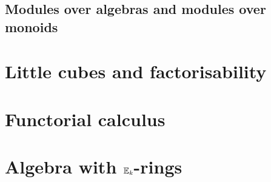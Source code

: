         \subsection{Modules over algebras and modules over monoids}
    
    \section{Little cubes and factorisability}
    
    \section{Functorial calculus}
    
    \section{Algebra with \texorpdfstring{$\mathbb{E}_k$}{}-rings}